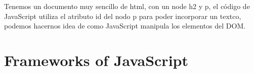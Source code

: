 Tenemos un documento muy sencillo de html, con un node h2 y p, el c\'odigo de JavaScript utiliza el atributo id del nodo p para poder incorporar un textco,
podemos hacernos idea de como JavaScript manipula los elementos del DOM.



\chapter{Frameworks of JavaScript}
